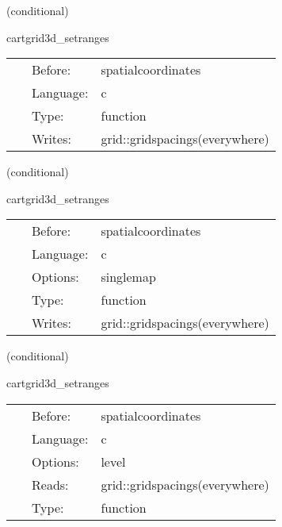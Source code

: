 \documentclass{article}
\begin{document}
   (conditional) 

\hspace{5mm} cartgrid3d\_setranges 

\hspace{5mm}{\it set up ranges for spatial 3d cartesian coordinates (on all grids) } 


\hspace{5mm}

 \begin{tabular*}{160mm}{cll} 
~ & Before:  & spatialcoordinates \\ 
~ & Language:  & c \\ 
~ & Type:  & function \\ 
~ & Writes:  & grid::gridspacings(everywhere) \\ 
\end{tabular*} 


\vspace{5mm}

   (conditional) 

\hspace{5mm} cartgrid3d\_setranges 

\hspace{5mm}{\it set up ranges for spatial 3d cartesian coordinates (on all maps) } 


\hspace{5mm}

 \begin{tabular*}{160mm}{cll} 
~ & Before:  & spatialcoordinates \\ 
~ & Language:  & c \\ 
~ & Options:  & singlemap \\ 
~ & Type:  & function \\ 
~ & Writes:  & grid::gridspacings(everywhere) \\ 
\end{tabular*} 


\vspace{5mm}

   (conditional) 

\hspace{5mm} cartgrid3d\_setranges 

\hspace{5mm}{\it set up ranges for spatial 3d cartesian coordinates (on first level) } 


\hspace{5mm}

 \begin{tabular*}{160mm}{cll} 
~ & Before:  & spatialcoordinates \\ 
~ & Language:  & c \\ 
~ & Options:  & level \\ 
~ & Reads:  & grid::gridspacings(everywhere) \\ 
~ & Type:  & function \\ 
\end{tabular*} 
\end{document}
